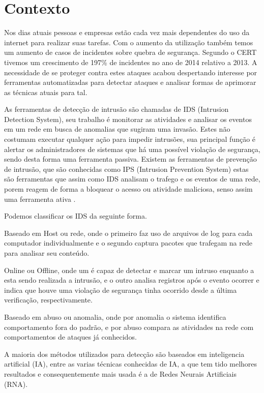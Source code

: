 \documentclass[
	12pt,				%
	openright,			%
	oneside,
	a4paper,			%
	english,			%
	french,				%
	spanish,			%
	brazil				%
	]{abntex2}
\begin{document}
\section{Contexto}

Nos dias atuais pessoas e empresas estão cada vez mais dependentes do uso da internet para realizar suas tarefas. Com o aumento da utilização também temos um aumento de casos de incidentes sobre quebra de segurança. Segundo o CERT \cite{CERT} tivemos um crescimento de 197\% de incidentes no ano de 2014 relativo a 2013. A necessidade de se proteger contra estes
ataques acabou despertando interesse por ferramentas automatizadas para detectar ataques e analisar formas de aprimorar as técnicas atuais para tal.

As ferramentas de detecção de intrusão são chamadas de IDS (Intrusion Detection System), seu trabalho é monitorar as atividades e analisar os eventos em um rede em busca de anomalias que sugiram uma invasão. Estes não costumam executar qualquer ação para impedir intrusões, sua principal função é alertar os administradores de sistemas que há uma possível violação de segurança, sendo desta forma uma ferramenta passiva.
Existem as ferramentas de prevenção de intrusão, que são conhecidas como IPS (Intrusion Prevention System) estas são ferramentas que assim como IDS analisam o trafego e os eventos de uma rede, porem reagem de forma a bloquear o acesso ou atividade maliciosa, senso assim uma ferramenta ativa .

Podemos classificar os IDS da seguinte forma.

Baseado em Host ou rede, onde o primeiro faz uso de arquivos de log para cada computador individualmente e o segundo captura pacotes que trafegam na rede para analisar seu conteúdo.

Online ou Offline, onde um é capaz de detectar e marcar um intruso enquanto a esta sendo realizada a intrusão, e o outro analisa registros após o evento ocorrer e indica que houve uma violação de segurança tinha ocorrido desde a última verificação, respectivamente.

Baseado em abuso ou anomalia, onde por anomalia o sistema identifica comportamento fora do padrão, e por abuso compara as atividades na rede com comportamentos de ataques já conhecidos.

A maioria dos métodos utilizados para detecção são baseados em inteligencia artificial (IA), entre as varias técnicas conhecidas de IA, a que tem tido melhores resultados e consequentemente mais usada é a de Redes Neurais Artificiais (RNA)\cite{Jake-Ryan}\cite{Stampar}.
\end{document}
